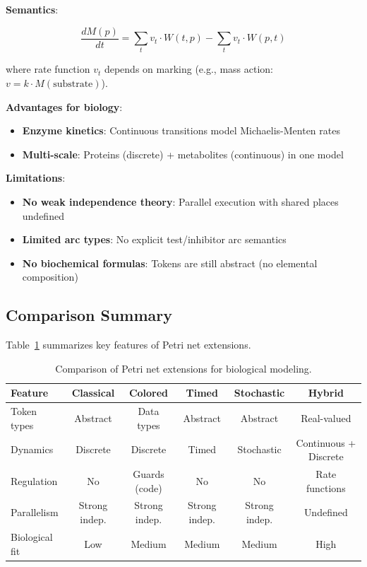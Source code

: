 \textbf{Semantics}:

\begin{equation}
\frac{dM(p)}{dt} = \sum_{t} v_t \cdot W(t,p) - \sum_{t} v_t \cdot W(p,t)
\end{equation}

where rate function $v_t$ depends on marking (e.g., mass action: $v = k \cdot M(\text{substrate})$).

\textbf{Advantages for biology}:

\begin{itemize}
    \item \textbf{Enzyme kinetics}: Continuous transitions model Michaelis-Menten rates
    \item \textbf{Multi-scale}: Proteins (discrete) + metabolites (continuous) in one model
\end{itemize}

\textbf{Limitations}:

\begin{itemize}
    \item \textbf{No weak independence theory}: Parallel execution with shared places undefined
    \item \textbf{Limited arc types}: No explicit test/inhibitor arc semantics
    \item \textbf{No biochemical formulas}: Tokens are still abstract (no elemental composition)
\end{itemize}

\subsection{Comparison Summary}
\label{subsec:pn-comparison}

Table~\ref{tab:pn-extensions} summarizes key features of Petri net extensions.

\begin{table}[htbp]
\centering
\caption{Comparison of Petri net extensions for biological modeling.}
\label{tab:pn-extensions}
\begin{tabular}{lccccc}
\toprule
\textbf{Feature} & \textbf{Classical} & \textbf{Colored} & \textbf{Timed} & \textbf{Stochastic} & \textbf{Hybrid} \\
\midrule
Token types & Abstract & Data types & Abstract & Abstract & Real-valued \\
Dynamics & Discrete & Discrete & Timed & Stochastic & Continuous + Discrete \\
Regulation & No & Guards (code) & No & No & Rate functions \\
Parallelism & Strong indep. & Strong indep. & Strong indep. & Strong indep. & Undefined \\
Biological fit & Low & Medium & Medium & Medium & High \\
\bottomrule
\end{tabular}
\end{table}

